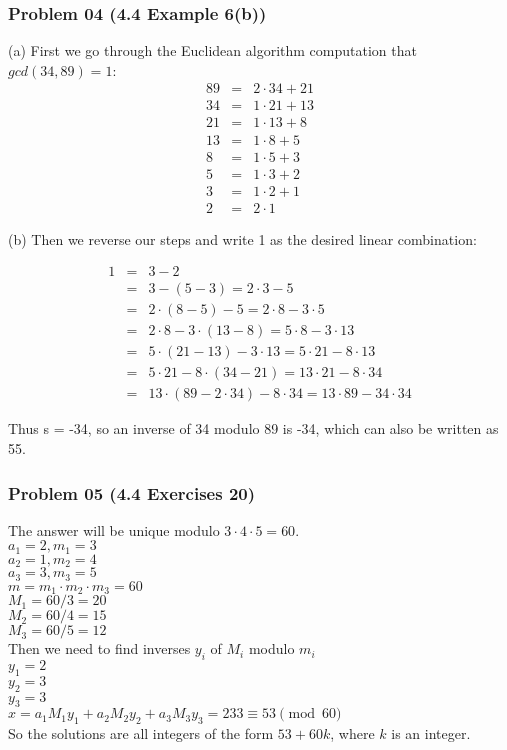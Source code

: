 \documentclass[14pt,hyperref={bookmarks=false}]{beamer}
\begin{document}
	\begin{frame}
	\frametitle{Problem 04 (4.4 Example 6(b))}
	\fontsize{7}{8pt}\selectfont
	\setlength{\baselineskip}{5pt}

	(a)	First we go through the Euclidean algorithm computation that $gcd(34, 89) = 1$:
	\begin{eqnarray*}
	89 & = & 2 · 34 + 21 \\
	34 & = & 1 · 21 + 13  \\
	21 & = & 1 · 13 + 8  \\
	13 & = & 1 · 8 + 5  \\
	 8 & = & 1 · 5 + 3  \\
	 5 & = & 1 · 3 + 2  \\
	 3 & = & 1 · 2 + 1 \\
	 2 & = & 2 · 1 
	\end{eqnarray*}


    (b) Then we reverse our steps and write 1 as the desired linear combination:
    
	\begin{eqnarray*}
	1 & = & 3 − 2 \\
	~ & = & 3 - (5 - 3) = 2 · 3 - 5  \\
	~ & = & 2 · (8 - 5) - 5 = 2 · 8 - 3 · 5  \\
	~ & = & 2 · 8 - 3 · (13 - 8) = 5 · 8 - 3 · 13  \\
	~ & = & 5 · (21 - 13) - 3 · 13 = 5 · 21 - 8 · 13  \\
	~ & = & 5 · 21 - 8 · (34 - 21) = 13 · 21 - 8 · 34  \\
	~ & = & 13 · (89 - 2 · 34) - 8 · 34 = 13 · 89 - 34 · 34
	\end{eqnarray*}
	
    Thus s = -34, so an inverse of 34 modulo 89 is -34, which can also be written as 55.
	\end{frame}
	
	\begin{frame}
	\frametitle{Problem 05 (4.4 Exercises 20)}
	\fontsize{10}{10pt}\selectfont
	The answer will be unique modulo $3 · 4 · 5 = 60$.\\
	$a_1 = 2, m_1 = 3$\\ 
	$a_2 = 1, m_2 = 4$\\ 
	$a_3 = 3, m_3 = 5$\\ 
    \vspace*{0.1cm}
	$m = m_1 · m_2 · m_3 =60$ \\
    $M_1 = 60/3 = 20$\\
    $M_2 = 60/4 = 15$\\
    $M_3 = 60/5 = 12$\\
    \vspace*{0.1cm}
	Then we need to find inverses $y_i$ of $M_i$ modulo $m_i$\\
    $y_1 = 2$\\
    $y_2 = 3$\\
    $y_3 = 3$\\
    $ x =  a_1 M_1 y_1 + a_2 M_2 y_2 + a_3 M_3 y_3 = 233 \equiv 53 \pmod{60}$\\
    So the solutions are all integers of the form $53 + 60k$, where $k$ is an integer.
	\end{frame}
	
\end{document}
